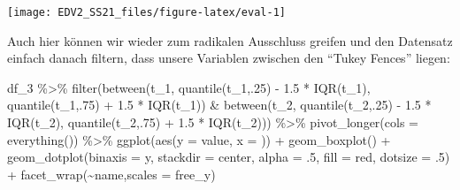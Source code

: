 \documentclass[
]{book}
\newenvironment{Shaded}{\begin{snugshade}}{\end{snugshade}}
\newcommand{\AttributeTok}[1]{\textcolor[rgb]{0.77,0.63,0.00}{#1}}
\newcommand{\DecValTok}[1]{\textcolor[rgb]{0.00,0.00,0.81}{#1}}
\newcommand{\FloatTok}[1]{\textcolor[rgb]{0.00,0.00,0.81}{#1}}
\newcommand{\FunctionTok}[1]{\textcolor[rgb]{0.00,0.00,0.00}{#1}}
\newcommand{\NormalTok}[1]{#1}
\newcommand{\SpecialCharTok}[1]{\textcolor[rgb]{0.00,0.00,0.00}{#1}}
\newcommand{\StringTok}[1]{\textcolor[rgb]{0.31,0.60,0.02}{#1}}
\begin{document}
\begin{center}\texttt{[image: EDV2\_SS21\_files/figure-latex/eval-1]} \end{center}

Auch hier können wir wieder zum radikalen Ausschluss greifen und den Datensatz einfach danach filtern, dass unsere Variablen zwischen den ``Tukey Fences'' liegen:

\begin{Shaded}
\begin{Highlighting}[]
\NormalTok{df\_3 }\SpecialCharTok{\%\textgreater{}\%} 
  \FunctionTok{filter}\NormalTok{(}\FunctionTok{between}\NormalTok{(t\_1, }
                 \FunctionTok{quantile}\NormalTok{(t\_1,.}\DecValTok{25}\NormalTok{) }\SpecialCharTok{{-}} \FloatTok{1.5} \SpecialCharTok{*} \FunctionTok{IQR}\NormalTok{(t\_1),}
                 \FunctionTok{quantile}\NormalTok{(t\_1,.}\DecValTok{75}\NormalTok{) }\SpecialCharTok{+} \FloatTok{1.5} \SpecialCharTok{*} \FunctionTok{IQR}\NormalTok{(t\_1)) }\SpecialCharTok{\&}
           \FunctionTok{between}\NormalTok{(t\_2, }
                 \FunctionTok{quantile}\NormalTok{(t\_2,.}\DecValTok{25}\NormalTok{) }\SpecialCharTok{{-}} \FloatTok{1.5} \SpecialCharTok{*} \FunctionTok{IQR}\NormalTok{(t\_2),}
                 \FunctionTok{quantile}\NormalTok{(t\_2,.}\DecValTok{75}\NormalTok{) }\SpecialCharTok{+} \FloatTok{1.5} \SpecialCharTok{*} \FunctionTok{IQR}\NormalTok{(t\_2))) }\SpecialCharTok{\%\textgreater{}\%} 
  \FunctionTok{pivot\_longer}\NormalTok{(}\AttributeTok{cols =} \FunctionTok{everything}\NormalTok{()) }\SpecialCharTok{\%\textgreater{}\%} 
  \FunctionTok{ggplot}\NormalTok{(}\FunctionTok{aes}\NormalTok{(}\AttributeTok{y =}\NormalTok{ value, }\AttributeTok{x =} \StringTok{\textquotesingle{}\textquotesingle{}}\NormalTok{)) }\SpecialCharTok{+}
  \FunctionTok{geom\_boxplot}\NormalTok{() }\SpecialCharTok{+}
  \FunctionTok{geom\_dotplot}\NormalTok{(}\AttributeTok{binaxis =} \StringTok{\textquotesingle{}y\textquotesingle{}}\NormalTok{,}
               \AttributeTok{stackdir =} \StringTok{\textquotesingle{}center\textquotesingle{}}\NormalTok{,}
               \AttributeTok{alpha =}\NormalTok{ .}\DecValTok{5}\NormalTok{,}
               \AttributeTok{fill =} \StringTok{\textquotesingle{}red\textquotesingle{}}\NormalTok{,}
               \AttributeTok{dotsize =}\NormalTok{ .}\DecValTok{5}\NormalTok{) }\SpecialCharTok{+}
  \FunctionTok{facet\_wrap}\NormalTok{(}\SpecialCharTok{\textasciitilde{}}\NormalTok{name,}\AttributeTok{scales =} \StringTok{\textquotesingle{}free\_y\textquotesingle{}}\NormalTok{)}
\end{Highlighting}
\end{Shaded}
\end{document}
